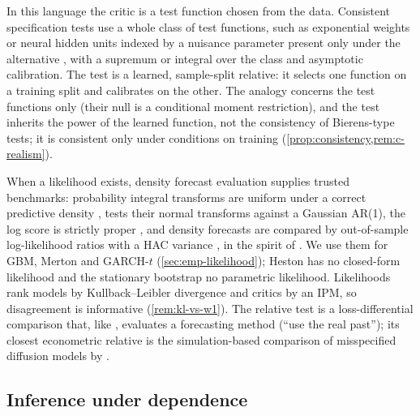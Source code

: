 In this language the critic is a test function chosen from the data. Consistent specification
tests use a whole class of test functions, such as exponential weights
\citep{bierens1990consistent} or neural hidden units indexed by a nuisance parameter present only
under the alternative \citep{stinchcombe1998consistent,lee1993testing}, with a supremum or integral
over the class and asymptotic calibration. The \WC{} test is a learned, sample-split relative: it
selects one function on a training split and calibrates on the other. The analogy concerns the test
functions only (their null is a conditional moment restriction), and the \WC{} test inherits the
power of the learned function, not the consistency of Bierens-type tests; it is consistent only
under conditions on training (\cref{prop:consistency,rem:c-realism}).

When a likelihood exists, density forecast evaluation supplies trusted benchmarks: probability
integral transforms are \iid{} uniform under a correct predictive density
\citep{diebold1998evaluating}, \citet{berkowitz2001testing} tests their normal transforms against a
Gaussian AR(1), the log score is strictly proper \citep{gneiting2007strictly}, and density forecasts
are compared by out-of-sample log-likelihood ratios with a HAC variance
\citep{amisano2007comparing}, in the spirit of \citet{vuong1989likelihood}. We use them for GBM,
Merton and GARCH-$t$ (\cref{sec:emp-likelihood}); Heston has no closed-form likelihood
\citep{aitsahalia2007maximum} and the stationary bootstrap no parametric likelihood. Likelihoods rank models by
Kullback--Leibler divergence and critics by an IPM, so disagreement is informative
(\cref{rem:kl-vs-w1}). The relative test is a loss-differential comparison
\citep{diebold1995comparing} that, like \citet{giacomini2006tests}, evaluates a forecasting method
(``use the real past''); its closest econometric relative is the simulation-based comparison of
misspecified diffusion models by \citet{corradi2011predictive}.

\subsection{Inference under dependence}\label{sec:lit-dependence}

